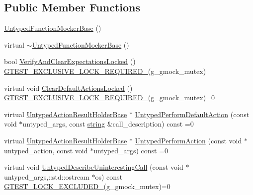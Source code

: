 \subsection*{Public Member Functions}
\begin{DoxyCompactItemize}
\item 
\hyperlink{classtesting_1_1internal_1_1UntypedFunctionMockerBase_aedfa95e65d80936e4dff040140513b36}{Untyped\+Function\+Mocker\+Base} ()
\item 
virtual \hyperlink{classtesting_1_1internal_1_1UntypedFunctionMockerBase_a6badd47a3fe2a439ef98aa91bf73d721}{$\sim$\+Untyped\+Function\+Mocker\+Base} ()
\item 
bool \hyperlink{classtesting_1_1internal_1_1UntypedFunctionMockerBase_a3f1d62a1662a3daa2895b3af963be269}{Verify\+And\+Clear\+Expectations\+Locked} () \hyperlink{gtest-port_8h_a149f693bd59fa1bc937af54c0cdcb32f}{G\+T\+E\+S\+T\+\_\+\+E\+X\+C\+L\+U\+S\+I\+V\+E\+\_\+\+L\+O\+C\+K\+\_\+\+R\+E\+Q\+U\+I\+R\+E\+D\+\_\+}(g\+\_\+gmock\+\_\+mutex)
\item 
virtual void \hyperlink{classtesting_1_1internal_1_1UntypedFunctionMockerBase_a40ddd95736946a7951033aa89a7b617f}{Clear\+Default\+Actions\+Locked} () \hyperlink{gtest-port_8h_a149f693bd59fa1bc937af54c0cdcb32f}{G\+T\+E\+S\+T\+\_\+\+E\+X\+C\+L\+U\+S\+I\+V\+E\+\_\+\+L\+O\+C\+K\+\_\+\+R\+E\+Q\+U\+I\+R\+E\+D\+\_\+}(g\+\_\+gmock\+\_\+mutex)=0
\item 
virtual \hyperlink{classtesting_1_1internal_1_1UntypedActionResultHolderBase}{Untyped\+Action\+Result\+Holder\+Base} $\ast$ \hyperlink{classtesting_1_1internal_1_1UntypedFunctionMockerBase_a2cb149456cd559d5b0615f2310b235e3}{Untyped\+Perform\+Default\+Action} (const void $\ast$untyped\+\_\+args, const \hyperlink{namespacetesting_1_1internal_a8e8ff5b11e64078831112677156cb111}{string} \&call\+\_\+description) const =0
\item 
virtual \hyperlink{classtesting_1_1internal_1_1UntypedActionResultHolderBase}{Untyped\+Action\+Result\+Holder\+Base} $\ast$ \hyperlink{classtesting_1_1internal_1_1UntypedFunctionMockerBase_ada5a72303863d0aa655b66338b8efea5}{Untyped\+Perform\+Action} (const void $\ast$untyped\+\_\+action, const void $\ast$untyped\+\_\+args) const =0
\item 
virtual void \hyperlink{classtesting_1_1internal_1_1UntypedFunctionMockerBase_aeb80e61406142e87f94fab10873e20ce}{Untyped\+Describe\+Uninteresting\+Call} (const void $\ast$untyped\+\_\+args,\+::std\+::ostream $\ast$os) const \hyperlink{gtest-port_8h_a69abff5a4efdd07bd5faebe3dd318d06}{G\+T\+E\+S\+T\+\_\+\+L\+O\+C\+K\+\_\+\+E\+X\+C\+L\+U\+D\+E\+D\+\_\+}(g\+\_\+gmock\+\_\+mutex)=0

\end{DoxyCompactItemize}

